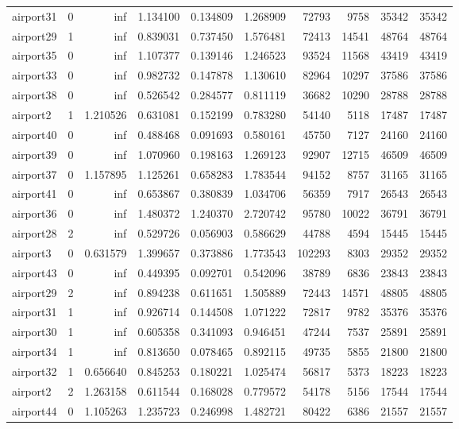 \begin{longtable}{|l|r|r|r|r|r|r|r|r|r|}
airport31 & 0 & inf & 1.134100 & 0.134809 & 1.268909 & 72793 & 9758 & 35342 & 35342 \\
airport29 & 1 & inf & 0.839031 & 0.737450 & 1.576481 & 72413 & 14541 & 48764 & 48764 \\
airport35 & 0 & inf & 1.107377 & 0.139146 & 1.246523 & 93524 & 11568 & 43419 & 43419 \\
airport33 & 0 & inf & 0.982732 & 0.147878 & 1.130610 & 82964 & 10297 & 37586 & 37586 \\
airport38 & 0 & inf & 0.526542 & 0.284577 & 0.811119 & 36682 & 10290 & 28788 & 28788 \\
airport2 & 1 & 1.210526 & 0.631081 & 0.152199 & 0.783280 & 54140 & 5118 & 17487 & 17487 \\
airport40 & 0 & inf & 0.488468 & 0.091693 & 0.580161 & 45750 & 7127 & 24160 & 24160 \\
airport39 & 0 & inf & 1.070960 & 0.198163 & 1.269123 & 92907 & 12715 & 46509 & 46509 \\
airport37 & 0 & 1.157895 & 1.125261 & 0.658283 & 1.783544 & 94152 & 8757 & 31165 & 31165 \\
airport41 & 0 & inf & 0.653867 & 0.380839 & 1.034706 & 56359 & 7917 & 26543 & 26543 \\
airport36 & 0 & inf & 1.480372 & 1.240370 & 2.720742 & 95780 & 10022 & 36791 & 36791 \\
airport28 & 2 & inf & 0.529726 & 0.056903 & 0.586629 & 44788 & 4594 & 15445 & 15445 \\
airport3 & 0 & 0.631579 & 1.399657 & 0.373886 & 1.773543 & 102293 & 8303 & 29352 & 29352 \\
airport43 & 0 & inf & 0.449395 & 0.092701 & 0.542096 & 38789 & 6836 & 23843 & 23843 \\
airport29 & 2 & inf & 0.894238 & 0.611651 & 1.505889 & 72443 & 14571 & 48805 & 48805 \\
airport31 & 1 & inf & 0.926714 & 0.144508 & 1.071222 & 72817 & 9782 & 35376 & 35376 \\
airport30 & 1 & inf & 0.605358 & 0.341093 & 0.946451 & 47244 & 7537 & 25891 & 25891 \\
airport34 & 1 & inf & 0.813650 & 0.078465 & 0.892115 & 49735 & 5855 & 21800 & 21800 \\
airport32 & 1 & 0.656640 & 0.845253 & 0.180221 & 1.025474 & 56817 & 5373 & 18223 & 18223 \\
airport2 & 2 & 1.263158 & 0.611544 & 0.168028 & 0.779572 & 54178 & 5156 & 17544 & 17544 \\
airport44 & 0 & 1.105263 & 1.235723 & 0.246998 & 1.482721 & 80422 & 6386 & 21557 & 21557 \\

\end{longtable}
